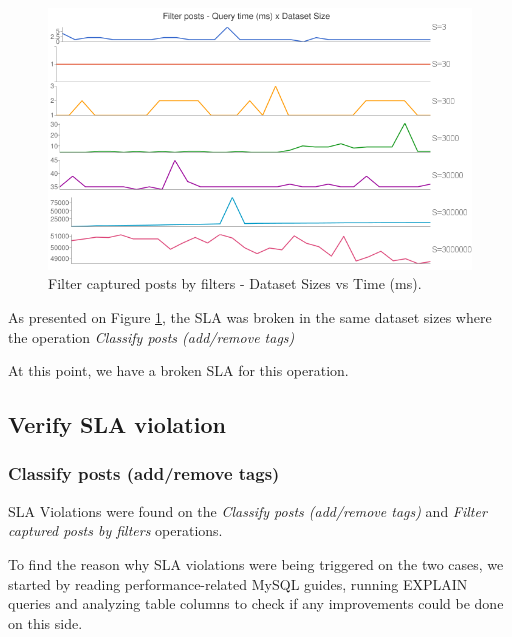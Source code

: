 \begin{figure}[ht!]
\centering
\includegraphics[width=120mm]{Imagens/filter-posts-query-time.png}
\caption{Filter captured posts by filters - Dataset Sizes vs Time (ms).\label{fig:filter-captured-posts-by-filters}}
\end{figure}

As presented on Figure \ref{fig:filter-captured-posts-by-filters}, the SLA was broken in the same dataset sizes where the operation \textit{Classify posts (add/remove tags)}

At this point, we have a broken SLA for this operation. 























\clearpage
\subsection{Verify SLA violation}
\subsubsection{Classify posts (add/remove tags)}

SLA Violations were found on the \textit{Classify posts (add/remove tags)} and \textit{Filter captured posts by filters} operations. 

To find the reason why SLA violations were being triggered on the two cases, we started by reading performance-related MySQL guides, running EXPLAIN queries and analyzing table columns to check if any improvements could be done on this side.

